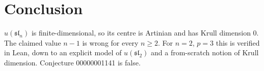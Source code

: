 \documentclass[11pt]{article}
\theoremstyle{definition}
\theoremstyle{remark}
\newcommand{\slt}{\mathfrak{sl}_2}
\newcommand{\sln}{\mathfrak{sl}_n}
\begin{document}
\section{Conclusion}
$u(\sln)$ is finite-dimensional, so its centre is Artinian and has Krull dimension $0$. The
claimed value $n-1$ is wrong for every $n\ge2$. For $n=2$, $p=3$ this is verified in Lean, down
to an explicit model of $u(\slt)$ and a from-scratch notion of Krull dimension. Conjecture
00000001141 is false.
\end{document}
